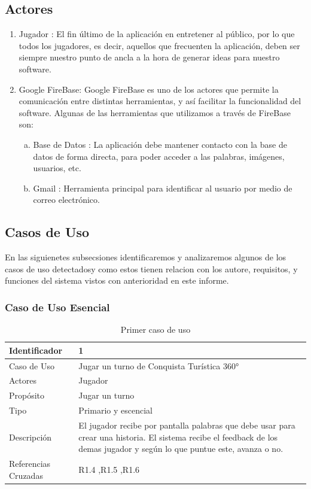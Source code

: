 \subsection{Actores}
\begin{enumerate}[1.]
	\item Jugador : El fin último de la aplicación en entretener al público, por lo que todos los jugadores, es decir, aquellos que frecuenten la aplicación, deben ser siempre nuestro punto de ancla a la hora de generar ideas para nuestro software.
	\item Google FireBase: Google FireBase es uno de los actores que permite la comunicación entre distintas herramientas, y así facilitar la funcionalidad del software. Algunas de las herramientas que utilizamos a través de FireBase son:
	\begin{enumerate}[a)]
		\item Base de Datos : La aplicación debe mantener contacto con la base de datos de forma directa, para poder acceder a las palabras, imágenes, usuarios, etc.
		\item Gmail : Herramienta principal para identificar al usuario por medio de correo electrónico.
	\end{enumerate} 
\end{enumerate}
\newpage
\subsection{Casos de Uso}
En las siguienetes subsecsiones identificaremos y analizaremos algunos de los casos de uso detectadosy como estos tienen relacion con los autore, requisitos, y funciones del sistema vistos con anterioridad en este informe.
\subsubsection{Caso de Uso Esencial}
\begin{table}[H]
    \begin{center}
        \begin{tabular}{| l | m{12cm} |}        
        	\hline 
        	Identificador & 1\\
        	\hline
        	Caso de Uso & Jugar un turno de Conquista Turística
360°\\
        	\hline
        	Actores & Jugador\\
        	\hline
        	Propósito & Jugar un turno\\
        	\hline
        	Tipo & Primario y escencial\\
        	\hline
        	Descripción & El jugador recibe por pantalla palabras que debe usar para crear una historia. El sistema recibe el feedback de los demas jugador y según lo que puntue este, avanza o no.\\
        	\hline
        	Referencias Cruzadas & R1.4 ,R1.5 ,R1.6\\
        	\hline
        \end{tabular}
    \caption{Primer caso de uso}
    \label{Caso_de_uso_1}
    \end{center}
\end{table}

